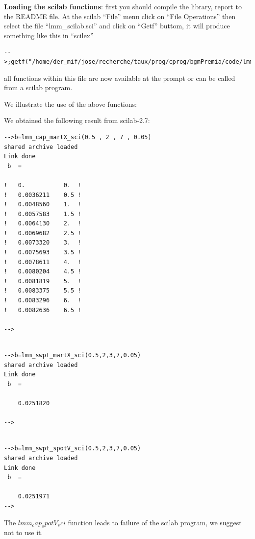 {\bf Loading the scilab functions}: first you should compile the library, report to the README file. At the scilab ``File'' menu click on ``File Operations'' then select the file ``lmm\_scilab.sci'' and click on ``Getf'' buttom, it will produce something like this in ``scilex''
\small{
\begin{verbatim} 
-->;getf("/home/der_mif/jose/recherche/taux/prog/cprog/bgmPremia/code/lmm_scilab.sci");
\end{verbatim} 
}

all functions within this file are now available at the prompt or can be called from a scilab program. 
 
We illustrate the use of the above functions: 

We obtained the following result from scilab-2.7:

\small{
\begin{verbatim}
-->b=lmm_cap_martX_sci(0.5 , 2 , 7 , 0.05)                                       
shared archive loaded
Link done
 b  =
 
!   0.           0.  !
!   0.0036211    0.5 !
!   0.0048560    1.  !
!   0.0057583    1.5 !
!   0.0064130    2.  !
!   0.0069682    2.5 !
!   0.0073320    3.  !
!   0.0075693    3.5 !
!   0.0078611    4.  !
!   0.0080204    4.5 !
!   0.0081819    5.  !
!   0.0083375    5.5 !
!   0.0083296    6.  !
!   0.0082636    6.5 !
 
-->
\end{verbatim} 
}

\small{
\begin{verbatim}
 
-->b=lmm_swpt_martX_sci(0.5,2,3,7,0.05)
shared archive loaded
Link done
 b  =
 
    0.0251820  
 
-->
\end{verbatim} 
}


\small{
\begin{verbatim}

-->b=lmm_swpt_spotV_sci(0.5,2,3,7,0.05)
shared archive loaded
Link done
 b  =
 
    0.0251971   
-->
\end{verbatim} 
}

The $lmm_cap_spotV_sci$ function leads to failure of the scilab program, we suggest not to use it. 


